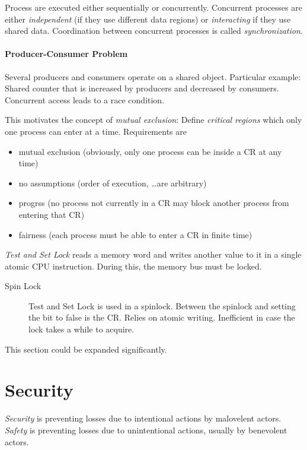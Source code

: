 \documentclass{article}
\begin{document}
\begin{multicols}{1}
Process are executed either sequentially or concurrently. Concurrent processes are either \emph{independent} (if they use different data regions) or \emph{interacting} if they use shared data. Coordination between concurrent processes is called \emph{synchronization}.

\paragraph{Producer-Consumer Problem} Several producers and consumers operate on a shared object. Particular example: Shared counter that is increased by producers and decreased by consumers. Concurrent access leads to a race condition.

This motivates the concept of \emph{mutual exclusion}: Define \emph{critical regions} which only one process can enter at a time. Requirements are
\begin{itemize}
    \item mutual exclusion (obviously, only one process can be inside a CR at any time)
    \item no assumptions (order of execution, \ldots are arbitrary)
    \item progrss (no process not currently in a CR may block another process from entering that CR)
    \item fairness (each process must be able to enter a CR in finite time)
\end{itemize}

\emph{Test and Set Lock} reads a memory word and writes another value to it in a single atomic CPU instruction. During this, the memory bus must be locked.

\begin{description}
    \item[Spin Lock] Test and Set Lock is used in a spinlock. Between the spinlock and setting the bit to false is the CR. Relies on atomic writing. Inefficient in case the lock takes a while to acquire.
\end{description}

This section could be expanded significantly.

\section*{Security}

\emph{Security} is preventing losses due to intentional actions by malovelent actors. \emph{Safety} is preventing losses due to unintentional actions, usually by benevolent actors.


\end{multicols}
\end{document}
